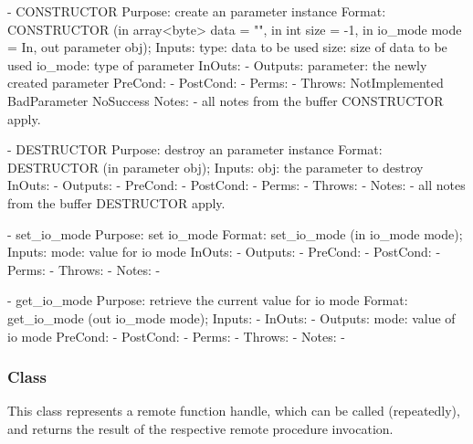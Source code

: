  
 \begin{myspec}
    - CONSTRUCTOR
      Purpose:  create an parameter instance
      Format:   CONSTRUCTOR          (in  array<byte> data = "",
                                      in  int         size = -1,
                                      in  io_mode     mode = In,
                                      out parameter       obj);
      Inputs:   type:                 data to be used
                size:                 size of data to be used
                io_mode:              type of parameter
      InOuts:   -
      Outputs:  parameter:            the newly created parameter 
      PreCond:  -
      PostCond: -
      Perms:    - 
      Throws:   NotImplemented
                BadParameter
                NoSuccess
      Notes:    - all notes from the buffer CONSTRUCTOR apply.
 
 
    - DESTRUCTOR
      Purpose:  destroy an parameter instance
      Format:   DESTRUCTOR           (in  parameter obj);
      Inputs:   obj:                  the parameter to destroy
      InOuts:   -
      Outputs:  -
      PreCond:  -
      PostCond: -
      Perms:    - 
      Throws:   - 
      Notes:    - all notes from the buffer DESTRUCTOR apply.
 
 
    - set_io_mode
      Purpose:  set io_mode
      Format:   set_io_mode          (in  io_mode mode);
      Inputs:   mode:                 value for io mode
      InOuts:   -
      Outputs:  -
      PreCond:  -
      PostCond: -
      Perms:    - 
      Throws:   -
      Notes:    - 
 
    - get_io_mode
      Purpose:  retrieve the current value for io mode
      Format:   get_io_mode          (out io_mode mode);
      Inputs:   -
      InOuts:   -
      Outputs:  mode:                 value of io mode
      PreCond:  -
      PostCond: -
      Perms:    - 
      Throws:   -
      Notes:    -
 \end{myspec}
 
 
  \subsubsection*{Class }
 
    This class represents a remote function handle, which can be
    called (repeatedly), and returns the result of the
    respective remote procedure invocation.  
    
